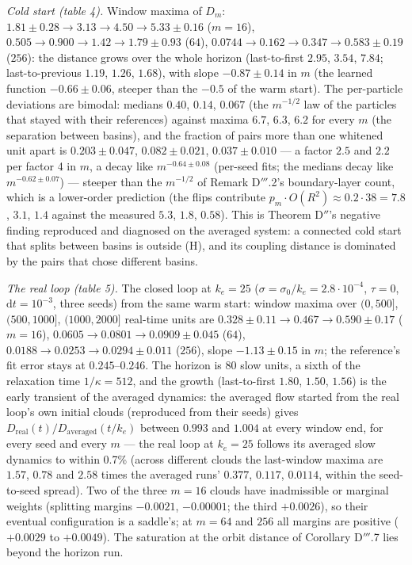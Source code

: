 \smallskip
\noindent\emph{Cold start (table 4).} Window maxima of $D_m$: $1.81\pm0.28\to3.13\to4.50\to5.33\pm0.16$
($m = 16$), $0.505\to0.900\to1.42\to1.79\pm0.93$ ($64$), $0.0744\to0.162\to0.347\to0.583\pm0.19$ ($256$): the
distance grows over the whole horizon (last-to-first $2.95$, $3.54$, $7.84$; last-to-previous $1.19$, $1.26$,
$1.68$), with slope $-0.87\pm0.14$ in $m$ (the learned function $-0.66\pm0.06$, steeper than the $-0.5$ of the warm start). The
per-particle deviations are
bimodal: medians $0.40$, $0.14$, $0.067$ (the $m^{-1/2}$ law of the particles that stayed with their references)
against maxima $6.7$, $6.3$, $6.2$ for every $m$ (the separation between basins), and the fraction of pairs more than
one whitened unit apart is $0.203\pm0.047$, $0.082\pm0.021$, $0.037\pm0.010$ --- a factor $2.5$ and $2.2$ per factor 4 in $m$, a decay like $m^{-0.64\pm0.08}$
(per-seed fits; the medians decay like $m^{-0.62\pm0.07}$) --- steeper than the $m^{-1/2}$ of Remark D$'''$.2's
boundary-layer count, which is a lower-order prediction (the flips contribute $p_m\cdot O(R^2)\approx0.2\cdot38 = 7.8$,
$3.1$, $1.4$ against the measured $5.3$, $1.8$, $0.58$). This is Theorem
D$''$'s negative finding reproduced and diagnosed on the averaged system: a connected cold start that splits between
basins is outside (H), and its coupling distance is dominated by the pairs that chose different basins.

\smallskip
\noindent\emph{The real loop (table 5).} The closed loop at $k_e = 25$ ($\sigma = \sigma_0/k_e = 2.8\cdot10^{-4}$,
$\tau = 0$, $\mathrm{d}t = 10^{-3}$, three seeds) from the same warm start: window maxima over $(0,500]$,
$(500,1000]$, $(1000,2000]$ real-time units are $0.328\pm0.11\to0.467\to0.590\pm0.17$ ($m = 16$),
$0.0605\to0.0801\to0.0909\pm0.045$ ($64$), $0.0188\to0.0253\to0.0294\pm0.011$ ($256$), slope $-1.13\pm0.15$ in $m$;
the reference's fit error stays at $0.245$--$0.246$. The horizon is 80 slow units, a sixth of the relaxation time
$1/\kappa = 512$, and the growth (last-to-first $1.80$, $1.50$, $1.56$) is the early transient of the averaged dynamics: the averaged
flow started from the real loop's own initial clouds (reproduced from their seeds) gives
$D_{\mathrm{real}}(t)/D_{\mathrm{averaged}}(t/k_e)$ between $0.993$ and $1.004$ at every window end, for every seed
and every $m$ --- the real loop at $k_e = 25$ follows its averaged slow dynamics to within 0.7\% (across different
clouds the last-window maxima are $1.57$, $0.78$ and $2.58$ times the averaged runs' $0.377$, $0.117$, $0.0114$,
within the seed-to-seed spread). Two of the three $m = 16$ clouds have inadmissible or marginal weights (splitting
margins $-0.0021$, $-0.00001$; the third $+0.0026$), so their eventual configuration is a saddle's; at $m = 64$ and
$256$ all margins are positive ($+0.0029$ to $+0.0049$). The saturation at the orbit distance of Corollary
D$'''$.7 lies beyond the horizon run.

